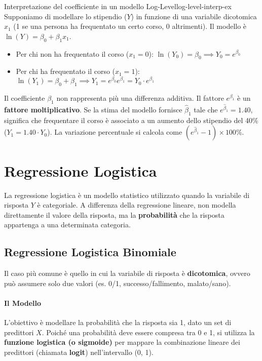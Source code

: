 \begin{esempio}{Interpretazione del coefficiente in un modello
Log-Level}{log-level-interp-ex}
Supponiamo di modellare lo stipendio (\(Y\)) in funzione di una variabile
dicotomica \(x_1\) (1 se una persona ha frequentato un certo corso, 0
altrimenti). Il modello è \(\ln(Y) = \beta_0 + \beta_1 x_1\).
\begin{itemize}
    \item Per chi non ha frequentato il corso (\(x_1=0\)): \( \ln(Y_0) = \beta_0
    \implies Y_0 = e^{\beta_0} \)
    \item Per chi ha frequentato il corso (\(x_1=1\)): \( \ln(Y_1) = \beta_0 +
    \beta_1 \implies Y_1 = e^{\beta_0}e^{\beta_1} = Y_0 \cdot e^{\beta_1} \)
\end{itemize}
Il coefficiente \(\beta_1\) non rappresenta più una differenza additiva. Il
fattore \(e^{\beta_1}\) è un \textbf{fattore moltiplicativo}. Se la stima del
modello fornisce \(\hat{\beta}_1\) tale che \(e^{\hat{\beta}_1} = 1.40\),
significa che frequentare il corso è associato a un aumento dello stipendio del
40\% (\(Y_1 = 1.40 \cdot Y_0\)). La variazione percentuale si calcola come
\((e^{\hat{\beta}_1} - 1) \times 100\%\).
\end{esempio}


\section{Regressione Logistica}

La regressione logistica è un modello statistico utilizzato quando la variabile
di risposta \(Y\) è categoriale. A differenza della regressione lineare, non
modella direttamente il valore della risposta, ma la \textbf{probabilità} che
la risposta appartenga a una determinata categoria.

\subsection{Regressione Logistica Binomiale}
Il caso più comune è quello in cui la variabile di risposta è
\textbf{dicotomica}, ovvero può assumere solo due valori (es. 0/1,
successo/fallimento, malato/sano).

\paragraph{Il Modello}
L'obiettivo è modellare la probabilità che la risposta sia 1, dato un set di
predittori \(X\). Poiché una probabilità deve essere compresa tra 0 e 1, si
utilizza la \textbf{funzione logistica (o sigmoide)} per mappare la combinazione
lineare dei predittori (chiamata \textbf{logit}) nell'intervallo (0, 1).

